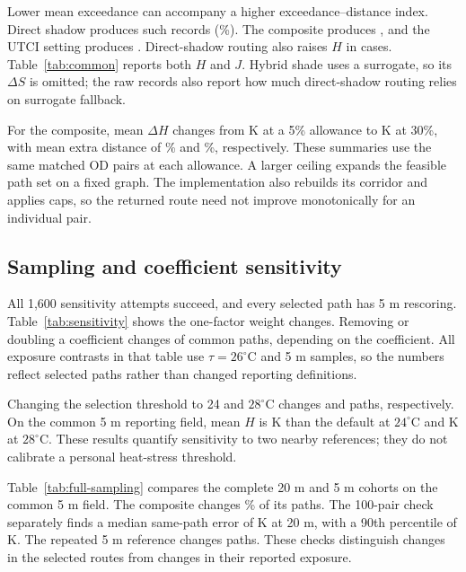 \documentclass[sigconf,nonacm]{acmart}
\begin{document}
\FullSamplingTable

Lower mean exceedance can accompany a higher exceedance--distance index. Direct shadow produces \ShadowReversalCount{} such records (\ShadowReversalPct{}\%). The composite produces \CompositeReversalCount{}, and the UTCI setting produces \HeatReversalCount{}. Direct-shadow routing also raises $H$ in \ShadowHigherHCount{} cases. Table~\ref{tab:common} reports both $H$ and $J$. Hybrid shade uses a surrogate, so its $\Delta S$ is omitted; the raw records also report how much direct-shadow routing relies on surrogate fallback.

For the composite, mean $\Delta H$ changes from \CompositeLowH{} K at a 5\% allowance to \CompositeHighH{} K at 30\%, with mean extra distance of \CompositeLowExtra{}\% and \CompositeHighExtra{}\%, respectively. These summaries use the same matched OD pairs at each allowance. A larger ceiling expands the feasible path set on a fixed graph. The implementation also rebuilds its corridor and applies caps, so the returned route need not improve monotonically for an individual pair.



\subsection{Sampling and coefficient sensitivity}
All 1,600 sensitivity attempts succeed, and every selected path has 5 m rescoring. Table~\ref{tab:sensitivity} shows the one-factor weight changes. Removing or doubling a coefficient changes \WeightChangeRange{} of \SensitivityPairs{} common paths, depending on the coefficient. All exposure contrasts in that table use $\tau=26^\circ$C and 5 m samples, so the numbers reflect selected paths rather than changed reporting definitions.

\WeightResultsTable

Changing the selection threshold to 24 and $28^\circ$C changes \ThresholdLowChanged{} and \ThresholdHighChanged{} paths, respectively. On the common 5 m reporting field, mean $H$ is \ThresholdLowMagnitude{} K \ThresholdLowDirection{} than the default at $24^\circ$C and \ThresholdHighMagnitude{} K \ThresholdHighDirection{} at $28^\circ$C. These results quantify sensitivity to two nearby references; they do not calibrate a personal heat-stress threshold.


Table~\ref{tab:full-sampling} compares the complete 20 m and 5 m cohorts on the common 5 m field. The composite changes \FullCompositeChangedPct{}\% of its paths. The 100-pair check separately finds a median same-path error of \SpacingMedian{} K at 20 m, with a 90th percentile of \SpacingPninety{} K. The repeated 5 m reference changes \ControlChanges{} paths. These checks distinguish changes in the selected routes from changes in their reported exposure.
\end{document}
